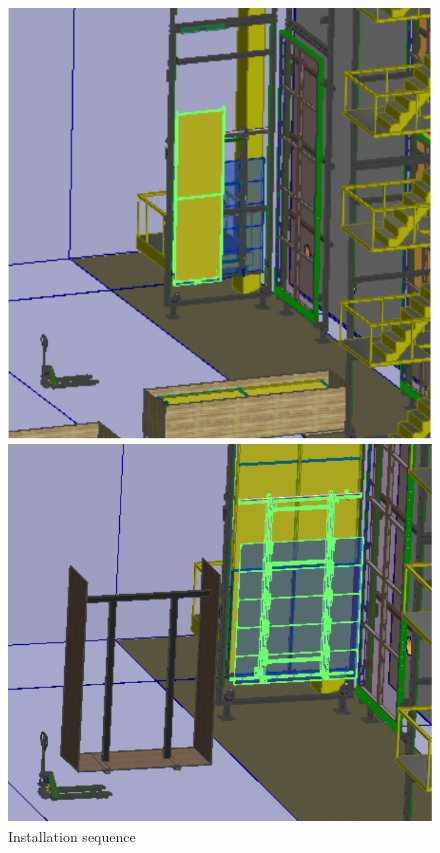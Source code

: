 \begin{figure}[!htb]
\begin{center}
\begin{minipage}[c]{0.32\textwidth}
\includegraphics[width=\textwidth]{far-detector-single-phase/figures/CPA-2.pdf}
\end{minipage}
\begin{minipage}[c]{0.32\textwidth}
\includegraphics[width=\textwidth]{far-detector-single-phase/figures/CPA-3.pdf}
\end{minipage}

\caption{Installation sequence}
\label{Install-Seq}
\end{center}
\end{figure}

